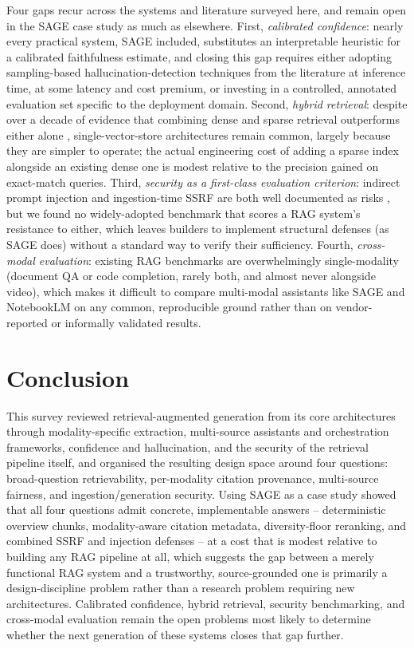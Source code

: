 \documentclass[conference]{IEEEtran}
\begin{document}
Four gaps recur across the systems and literature surveyed here, and
remain open in the SAGE case study as much as elsewhere. First,
\emph{calibrated confidence}: nearly every practical system, SAGE
included, substitutes an interpretable heuristic for a calibrated
faithfulness estimate, and closing this gap requires either adopting
sampling-based hallucination-detection techniques from the literature
\cite{huang2024hallucination} at inference time, at some latency and cost
premium, or investing in a controlled, annotated evaluation set specific
to the deployment domain. Second, \emph{hybrid retrieval}: despite over a
decade of evidence that combining dense and sparse retrieval outperforms
either alone \cite{cormack2009rrf}, single-vector-store architectures
remain common, largely because they are simpler to operate; the actual
engineering cost of adding a sparse index alongside an existing dense
one is modest relative to the precision gained on exact-match queries.
Third, \emph{security as a first-class evaluation criterion}: indirect
prompt injection and ingestion-time SSRF are both well documented as
risks \cite{greshake2023injection,owasp2025llm01}, but we found no
widely-adopted benchmark that scores a RAG system's resistance to either,
which leaves builders to implement structural defenses (as SAGE does)
without a standard way to verify their sufficiency. Fourth,
\emph{cross-modal evaluation}: existing RAG benchmarks are overwhelmingly
single-modality (document QA or code completion, rarely both, and almost
never alongside video), which makes it difficult to compare multi-modal
assistants like SAGE and NotebookLM on any common, reproducible ground
rather than on vendor-reported or informally validated results.

\section{Conclusion}

This survey reviewed retrieval-augmented generation from its core
architectures through modality-specific extraction, multi-source
assistants and orchestration frameworks, confidence and hallucination,
and the security of the retrieval pipeline itself, and organised the
resulting design space around four questions: broad-question
retrievability, per-modality citation provenance, multi-source fairness,
and ingestion/generation security. Using SAGE as a case study showed
that all four questions admit concrete, implementable answers --
deterministic overview chunks, modality-aware citation metadata,
diversity-floor reranking, and combined SSRF and injection defenses --
at a cost that is modest relative to building any RAG pipeline at all,
which suggests the gap between a merely functional RAG system and a
trustworthy, source-grounded one is primarily a design-discipline
problem rather than a research problem requiring new architectures.
Calibrated confidence, hybrid retrieval, security benchmarking, and
cross-modal evaluation remain the open problems most likely to determine
whether the next generation of these systems closes that gap further.
\end{document}
